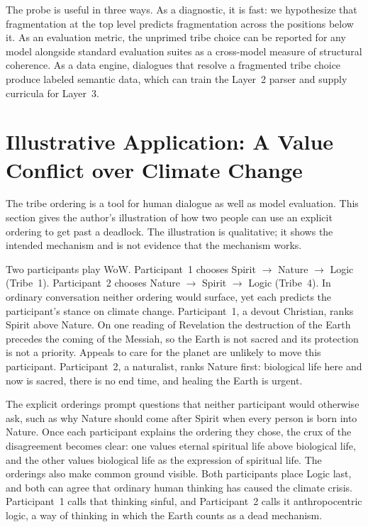 \documentclass[twocolumn]{ulpaper}
\begin{document}
The probe is useful in three ways. As a diagnostic, it is fast: we hypothesize that fragmentation at the top level predicts fragmentation across the positions below it. As an evaluation metric, the unprimed tribe choice can be reported for any model alongside standard evaluation suites as a cross-model measure of structural coherence. As a data engine, dialogues that resolve a fragmented tribe choice produce labeled semantic data, which can train the Layer~2 parser and supply curricula for Layer~3.

\section{Illustrative Application: A Value Conflict over Climate Change}
\label{sec:case}

The tribe ordering is a tool for human dialogue as well as model evaluation. This section gives the author's illustration of how two people can use an explicit ordering to get past a deadlock. The illustration is qualitative; it shows the intended mechanism and is not evidence that the mechanism works.

Two participants play WoW. Participant~1 chooses Spirit $\to$ Nature $\to$ Logic (Tribe~1). Participant~2 chooses Nature $\to$ Spirit $\to$ Logic (Tribe~4). In ordinary conversation neither ordering would surface, yet each predicts the participant's stance on climate change. Participant~1, a devout Christian, ranks Spirit above Nature. On one reading of Revelation the destruction of the Earth precedes the coming of the Messiah, so the Earth is not sacred and its protection is not a priority. Appeals to care for the planet are unlikely to move this participant. Participant~2, a naturalist, ranks Nature first: biological life here and now is sacred, there is no end time, and healing the Earth is urgent.

The explicit orderings prompt questions that neither participant would otherwise ask, such as why Nature should come after Spirit when every person is born into Nature. Once each participant explains the ordering they chose, the crux of the disagreement becomes clear: one values eternal spiritual life above biological life, and the other values biological life as the expression of spiritual life. The orderings also make common ground visible. Both participants place Logic last, and both can agree that ordinary human thinking has caused the climate crisis. Participant~1 calls that thinking sinful, and Participant~2 calls it anthropocentric logic, a way of thinking in which the Earth counts as a dead mechanism.
\end{document}
